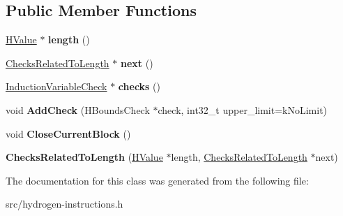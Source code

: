 \subsection*{Public Member Functions}
\begin{DoxyCompactItemize}
\item 
\hypertarget{classv8_1_1internal_1_1_v8___f_i_n_a_l_1_1_checks_related_to_length_af00341167f262a2944df003fd3e2f033}{}\hyperlink{classv8_1_1internal_1_1_h_value}{H\+Value} $\ast$ {\bfseries length} ()\label{classv8_1_1internal_1_1_v8___f_i_n_a_l_1_1_checks_related_to_length_af00341167f262a2944df003fd3e2f033}

\item 
\hypertarget{classv8_1_1internal_1_1_v8___f_i_n_a_l_1_1_checks_related_to_length_ada6cdb8c12b9237b077abebebe12fe1e}{}\hyperlink{classv8_1_1internal_1_1_v8___f_i_n_a_l_1_1_checks_related_to_length}{Checks\+Related\+To\+Length} $\ast$ {\bfseries next} ()\label{classv8_1_1internal_1_1_v8___f_i_n_a_l_1_1_checks_related_to_length_ada6cdb8c12b9237b077abebebe12fe1e}

\item 
\hypertarget{classv8_1_1internal_1_1_v8___f_i_n_a_l_1_1_checks_related_to_length_aa0ef884890c4902801897d9c48629aab}{}\hyperlink{classv8_1_1internal_1_1_v8___f_i_n_a_l_1_1_induction_variable_check}{Induction\+Variable\+Check} $\ast$ {\bfseries checks} ()\label{classv8_1_1internal_1_1_v8___f_i_n_a_l_1_1_checks_related_to_length_aa0ef884890c4902801897d9c48629aab}

\item 
\hypertarget{classv8_1_1internal_1_1_v8___f_i_n_a_l_1_1_checks_related_to_length_ae422953c8a49d2a53933175da9c981de}{}void {\bfseries Add\+Check} (H\+Bounds\+Check $\ast$check, int32\+\_\+t upper\+\_\+limit=k\+No\+Limit)\label{classv8_1_1internal_1_1_v8___f_i_n_a_l_1_1_checks_related_to_length_ae422953c8a49d2a53933175da9c981de}

\item 
\hypertarget{classv8_1_1internal_1_1_v8___f_i_n_a_l_1_1_checks_related_to_length_a1b2ca95f780bf6177183056857ca18b3}{}void {\bfseries Close\+Current\+Block} ()\label{classv8_1_1internal_1_1_v8___f_i_n_a_l_1_1_checks_related_to_length_a1b2ca95f780bf6177183056857ca18b3}

\item 
\hypertarget{classv8_1_1internal_1_1_v8___f_i_n_a_l_1_1_checks_related_to_length_aed42c9ce6e2ced7cbfcf6555cc878da7}{}{\bfseries Checks\+Related\+To\+Length} (\hyperlink{classv8_1_1internal_1_1_h_value}{H\+Value} $\ast$length, \hyperlink{classv8_1_1internal_1_1_v8___f_i_n_a_l_1_1_checks_related_to_length}{Checks\+Related\+To\+Length} $\ast$next)\label{classv8_1_1internal_1_1_v8___f_i_n_a_l_1_1_checks_related_to_length_aed42c9ce6e2ced7cbfcf6555cc878da7}

\end{DoxyCompactItemize}


The documentation for this class was generated from the following file\+:\begin{DoxyCompactItemize}
\item 
src/hydrogen-\/instructions.\+h\end{DoxyCompactItemize}
